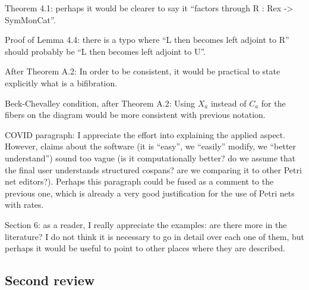 \documentclass[reqno]{amsart}
\begin{document}
{Theorem 4.1: perhaps it would be clearer to say it “factors through R : Rex -> SymMonCat”.

Proof of Lemma 4.4: there is a typo where “L then becomes left adjoint to R” should probably be “L then becomes left adjoint to U”.

After Theorem A.2: In order to be consistent, it would be practical to state explicitly what is a bifibration.

Beck-Chevalley condition, after Theorem A.2: Using $X_a$ instead of $C_a$ for the fibers on the diagram would be more consistent with previous 
notation.

COVID paragraph: I appreciate the effort into explaining the applied aspect. However, claims about the software (it is “easy”, we “easily” modify, we 
“better understand”) sound too vague (is it computationally better? do we assume that the final user understands structured cospans? are we comparing 
it to other Petri net editors?). Perhaps this paragraph could be fused as a comment to the previous one, which is already a very good justification 
for the use of Petri nets with rates.

Section 6: as a reader, I really appreciate the examples: are there more in the literature? I do not think it is necessary to go in detail over each 
one of them, but perhaps it would be useful to point to other places where they are described.}

\subsection{Second review}
\end{document}
